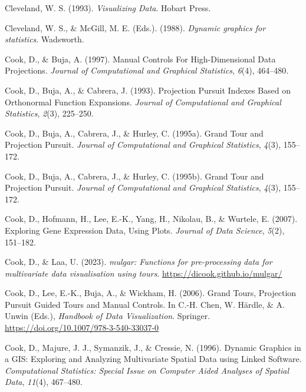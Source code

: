 \documentclass[
  letterpaper,
]{krantz}
\newlength{\cslhangindent}
\newenvironment{CSLReferences}[2] %
 {\begin{list}{}{%
  \setlength{\itemindent}{0pt}
  \setlength{\leftmargin}{0pt}
  \setlength{\parsep}{0pt}
  \ifodd #1
   \setlength{\leftmargin}{\cslhangindent}
   \setlength{\itemindent}{-1\cslhangindent}
  \fi
  \setlength{\itemsep}{#2\baselineskip}}}
 {\end{list}}
\begin{document}
\begin{CSLReferences}{1}{0}
Cleveland, W. S. (1993). \emph{Visualizing {D}ata}. Hobart Press.

Cleveland, W. S., \& McGill, M. E. (Eds.). (1988). \emph{Dynamic
graphics for statistics}. Wadsworth.

Cook, D., \& Buja, A. (1997). {M}anual {C}ontrols {F}or
{H}igh-{D}imensional {D}ata {P}rojections. \emph{Journal of
Computational and Graphical Statistics}, \emph{6}(4), 464--480.

Cook, D., Buja, A., \& Cabrera, J. (1993). {P}rojection {P}ursuit
{I}ndexes {B}ased on {O}rthonormal {F}unction {E}xpansions.
\emph{Journal of Computational and Graphical Statistics}, \emph{2}(3),
225--250.

Cook, D., Buja, A., Cabrera, J., \& Hurley, C. (1995a). Grand {T}our and
{P}rojection {P}ursuit. \emph{Journal of Computational and Graphical
Statistics}, \emph{4}(3), 155--172.

Cook, D., Buja, A., Cabrera, J., \& Hurley, C. (1995b). Grand {T}our and
{P}rojection {P}ursuit. \emph{Journal of Computational and Graphical
Statistics}, \emph{4}(3), 155--172.

Cook, D., Hofmann, H., Lee, E.-K., Yang, H., Nikolau, B., \& Wurtele, E.
(2007). Exploring {G}ene {E}xpression {D}ata, {U}sing {P}lots.
\emph{Journal of Data Science}, \emph{5}(2), 151--182.

Cook, D., \& Laa, U. (2023). \emph{{mulgar}: Functions for
pre-processing data for multivariate data visualisation using tours}.
\url{https://dicook.github.io/mulgar/}

Cook, D., Lee, E.-K., Buja, A., \& Wickham, H. (2006). {G}rand {T}ours,
{P}rojection {P}ursuit {G}uided {T}ours and {M}anual {C}ontrols. In
C.-H. Chen, W. Härdle, \& A. Unwin (Eds.), \emph{Handbook of {D}ata
{V}isualization}. Springer.
\url{https://doi.org/10.1007/978-3-540-33037-0}

Cook, D., Majure, J. J., Symanzik, J., \& Cressie, N. (1996). {D}ynamic
{G}raphics in a {GIS}: {E}xploring and {A}nalyzing {M}ultivariate
{S}patial {D}ata using {L}inked {S}oftware. \emph{Computational
Statistics: Special Issue on Computer Aided Analyses of Spatial Data},
\emph{11}(4), 467--480.


\end{CSLReferences}
\end{document}

